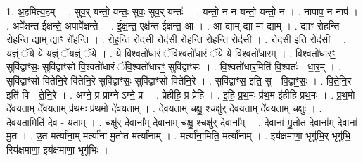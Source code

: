 \documentclass[17pt]{extarticle}
\begin{document}
1. अ॒हमित्य॒हम् । . सुव॒र् यन्तो॒ यन्तः॒ सुवः॒ सुव॒र् यन्तः॑ । . यन्तो॒ न न यन्तो॒ यन्तो॒ न । . नापाप॒ न नाप॑ । . अपे᳚क्षन्त ईक्षन्ते॒ अपापे᳚क्षन्ते । . ई॒क्ष॒न्त॒ एक्ष॑न्त ईक्षन्त॒ आ । . आ द्याम् द्या मा द्याम् । . द्याꣳ रो॑हन्ति रोहन्ति॒ द्याम् द्याꣳ रो॑हन्ति । . रो॒ह॒न्ति॒ रोद॑सी॒ रोद॑सी रोहन्ति रोहन्ति॒ रोद॑सी । . रोद॑सी॒ इति॒ रोद॑सी । . य॒ज्ञ्ं ॅये ये य॒ज्ञ्ं ॅय॒ज्ञ्ं ॅये । . ये वि॒श्वतो॑धारं ॅवि॒श्वतो॑धारं॒ ॅये ये वि॒श्वतो॑धारम् । . वि॒श्वतो॑धारꣳ॒॒ सुवि॑द्वाꣳसः॒ सुवि॑द्वाꣳसो वि॒श्वतो॑धारं ॅवि॒श्वतो॑धारꣳ॒॒ सुवि॑द्वाꣳसः । . वि॒श्वतो॑धार॒मिति॑ वि॒श्वतः॑ - धा॒र॒म् । . सुवि॑द्वाꣳसो वितेनि॒रे वि॑तेनि॒रे सुवि॑द्वाꣳसः॒ सुवि॑द्वाꣳसो वितेनि॒रे । . सुवि॑द्वाꣳस॒ इति॒ सु - वि॒द्वाꣳ॒॒सः॒ । . वि॒ते॒नि॒र इति॑ वि - ते॒नि॒रे । . अग्ने॒ प्र प्राग्ने ऽग्ने॒ प्र । . प्रेही॑हि॒ प्र प्रेहि॑ । . इ॒हि॒ प्र॒थ॒मः प्र॑थ॒म इ॑हीहि प्रथ॒मः । . प्र॒थ॒मो दे॑वय॒ताम् दे॑वय॒ताम् प्र॑थ॒मः प्र॑थ॒मो दे॑वय॒ताम् । . दे॒व॒य॒ताम् चक्षु॒ श्चक्षु॑र् देवय॒ताम् दे॑वय॒ताम् चक्षुः॑ । . दे॒व॒य॒तामिति॑ देव - य॒ताम् । . चक्षु॑र् दे॒वाना᳚म् दे॒वाना॒म् चक्षु॒ श्चक्षु॑र् दे॒वाना᳚म् । . दे॒वाना॑ मु॒तोत दे॒वाना᳚म् दे॒वाना॑ मु॒त । . उ॒त मर्त्या॑ना॒म् मर्त्या॑ना मु॒तोत मर्त्या॑नाम् । . मर्त्या॑ना॒मिति॒ मर्त्या॑नाम् । . इय॑क्षमाणा॒ भृगु॑भि॒र् भृगु॑भि॒ रिय॑क्षमाणा॒ इय॑क्षमाणा॒ भृगु॑भिः । \newline
\end{document}
